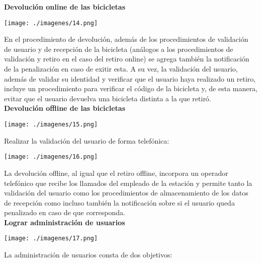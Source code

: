 \documentclass[a4paper, 11pt, spanish]{article}
\begin{document}
\textbf{Devolución online de las bicicletas}\\

\vspace*{0.7cm}
\centerline{\texttt{[image: ./imagenes/14.png]}}
\vspace*{0.7cm}

En el procedimiento de devolución, además de los procedimientos de validación de usuario y de recepción de la bicicleta (análogos a los procedimientos de validación y retiro en el caso del retiro online) se agrega también la notificación de la penalización en caso de exitir esta. A su vez, la validación del usuario, además de validar su identidad y verificar que el usuario haya realizado un retiro, incluye un procedimiento para verificar el código de la bicicleta y, de esta manera, evitar que el usuario devuelva una bicicleta distinta a la que retiró.\\

\textbf{Devolución offline de las bicicletas}\\

\vspace*{0.7cm}
\centerline{\texttt{[image: ./imagenes/15.png]}}
\vspace*{0.7cm}

Realizar la validación del usuario de forma telefónica:\\

\vspace*{0.7cm}
\centerline{\texttt{[image: ./imagenes/16.png]}}
\vspace*{0.7cm}

La devolución offline, al igual que el retiro offline, incorpora un operador telefónico que recibe los llamados del empleado de la estación y permite tanto la validación del usuario como los procedimientos de almacenamiento de los datos de recepción como incluso también la notificación sobre si el usuario queda penalizado en caso de que corresponda.\\

\textbf{Lograr administración de usuarios}\\

\vspace*{0.7cm}
\centerline{\texttt{[image: ./imagenes/17.png]}}
\vspace*{0.7cm}

La administración de usuarios consta de dos objetivos:\\
\end{document}
